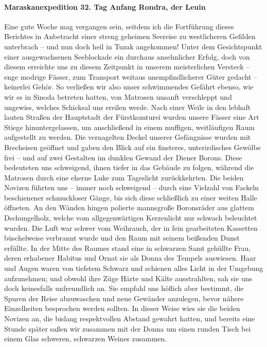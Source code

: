 \paragraph{Maraskanexpedition 32. Tag Anfang Rondra, der Leuin}
Eine gute Woche mag vergangen sein, seitdem ich die Fortführung dieses Berichtes in Anbetracht einer streng geheimen Seereise zu westlicheren Gefilden unterbrach -- und nun doch heil in Tuzak angekommen! Unter dem Gesichtspunkt einer ausgewachsenen Seeblockade ein durchaus ansehnlicher Erfolg, doch von diesem erreichte uns zu diesem Zeitpunkt in unserem meisterlichen Versteck -- enge modrige Fässer, zum Transport weitaus unempfindlicherer Güter gedacht -- keinerlei Gehör. So verließen wir also unser schwimmendes Gefährt ebenso, wie wir es in Sinoda betreten hatten, von Matrosen unsanft verschleppt und ungewiss, welches Schicksal uns ereilen werde. Nach einer Weile in den lebhaft lauten Straßen der Hauptstadt der Fürstkomturei wurden unsere Fässer eine Art Stiege hinuntergelassen, um anschließend in einem muffigen, weitläufigen Raum aufgestellt zu werden. Die vernagelten Deckel unserer Gefängnisse wurden mit Brecheisen geöffnet und gaben den Blick auf ein finsteres, unterirdisches Gewölbe frei -- und auf zwei Gestalten im dunklen Gewand der Diener Borons. Diese bedeuteten uns schweigend, ihnen tiefer in das Gebäude zu folgen, während die Matrosen durch eine eherne Luke zum Tageslicht zurückkehrten. Die beiden Novizen führten uns -- immer noch schweigend -- durch eine Vielzahl von Fackeln beschienener schmuckloser Gänge, bis sich diese schließlich zu einer weiten Halle öffneten. An den Wänden hingen polierte mannsgroße Boronsräder aus glattem Dschungelholz, welche vom allgegenwärtigen Kerzenlicht nur schwach beleuchtet wurden. Die Luft war schwer vom Weihrauch, der in fein gearbeiteten Kassetten büschelweise verbrannt wurde und den Raum mit seinem beißenden Dunst erfüllte. In der Mitte des Raumes stand eine in schwarzen Samt gehüllte Frau, deren erhabener Habitus und Ornat sie als Donna des Tempels auswiesen. Haar und Augen waren von tiefstem Schwarz und schienen alles Licht in der Umgebung aufzunehmen; und obwohl ihre Züge Härte und Kälte ausstrahlten, sah sie uns doch keinesfalls unfreundlich an. Sie empfahl uns höflich aber bestimmt, die Spuren der Reise abzuwaschen und neue Gewänder anzulegen, bevor nähere Einzelheiten besprochen werden sollten. In dieser Weise wies sie die beiden Novizen an, die bislang respektvollen Abstand gewahrt hatten, und bereits eine Stunde später saßen wir zusammen mit der Donna um einen runden Tisch bei einem Glas schweren, schwarzen Weines zusammen.

